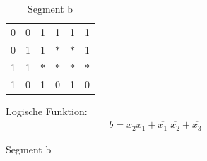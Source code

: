 \documentclass[numbers=noenddot,12pt,a4paper]{scrartcl}
\begin{document}
\begin{figure}[H]
\begin{minipage}[htbp]{0.49\textwidth}
\begin{table}[H]
\begin{tabular}{cc||cc|cc|cc|cc}
0 & 0 & \multicolumn{2}{|c|}{1} & \multicolumn{2}{|c|}{1} & \multicolumn{2}{|c|}{1} & \multicolumn{2}{|c}{1} \\
0 & 1 & \multicolumn{2}{|c|}{1} & \multicolumn{2}{|c|}{$\ast$} & \multicolumn{2}{|c|}{$\ast$} & \multicolumn{2}{|c}{1} \\ 
1 & 1 & \multicolumn{2}{|c|}{$\ast$} & \multicolumn{2}{|c|}{$\ast$} & \multicolumn{2}{|c|}{$\ast$} & \multicolumn{2}{|c}{$\ast$} \\ 
1 & 0 & \multicolumn{2}{|c|}{1} & \multicolumn{2}{|c|}{0} & \multicolumn{2}{|c|}{1} & \multicolumn{2}{|c}{0} \\ 
\end{tabular}
\caption{Segment b}
\end{table}
Logische Funktion:
\begin{align}
b=x_2 x_1 +\overline{x_1}\;\overline{x_2}+\overline{x_3}
\end{align}
\end{minipage}
\end{figure}
\end{document}
